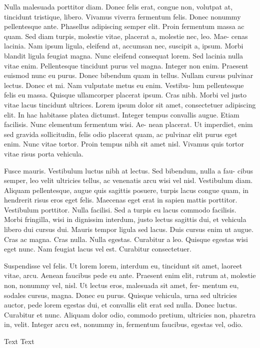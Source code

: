 \documentclass{book}
\begin{document}
Nulla malesuada porttitor diam. Donec felis erat, congue non, volutpat at,
tincidunt tristique, libero. Vivamus viverra fermentum felis. Donec nonummy
pellentesque ante. Phasellus adipiscing semper elit. Proin fermentum massa
ac quam. Sed diam turpis, molestie vitae, placerat a, molestie nec, leo. Mae-
cenas lacinia. Nam ipsum ligula, eleifend at, accumsan nec, suscipit a, ipsum.
Morbi blandit ligula feugiat magna. Nunc eleifend consequat lorem. Sed lacinia
nulla vitae enim. Pellentesque tincidunt purus vel magna. Integer non enim.
Praesent euismod nunc eu purus. Donec bibendum quam in tellus. Nullam
cursus pulvinar lectus. Donec et mi. Nam vulputate metus eu enim. Vestibu-
lum pellentesque felis eu massa.
Quisque ullamcorper placerat ipsum. Cras
nibh. Morbi vel justo vitae lacus tincidunt ultrices. Lorem ipsum dolor sit
amet, consectetuer adipiscing elit. In hac habitasse platea dictumst. Integer
tempus convallis augue. Etiam facilisis. Nunc elementum fermentum wisi. Ae-
nean placerat. Ut imperdiet, enim sed gravida sollicitudin, felis odio placerat
quam, ac pulvinar elit purus eget enim. Nunc vitae tortor. Proin tempus nibh
sit amet nisl. Vivamus quis tortor vitae risus porta vehicula.


Fusce mauris. Vestibulum luctus nibh at lectus. Sed bibendum, nulla a fau-
cibus semper, leo velit ultricies tellus, ac venenatis arcu wisi vel nisl. Vestibulum
diam. Aliquam pellentesque, augue quis sagittis posuere, turpis lacus congue
quam, in hendrerit risus eros eget felis. Maecenas eget erat in sapien mattis
porttitor. Vestibulum porttitor. Nulla facilisi. Sed a turpis eu lacus commodo
facilisis. Morbi fringilla, wisi in dignissim interdum, justo lectus sagittis dui, et
vehicula libero dui cursus dui. Mauris tempor ligula sed lacus. Duis cursus enim
ut augue. Cras ac magna. Cras nulla. Nulla egestas. Curabitur a leo. Quisque
egestas wisi eget nunc. Nam feugiat lacus vel est. Curabitur consectetuer.

Suspendisse vel felis. Ut lorem lorem, interdum eu, tincidunt sit amet,
laoreet vitae, arcu. Aenean faucibus pede eu ante. Praesent enim elit, rutrum
at, molestie non, nonummy vel, nisl. Ut lectus eros, malesuada sit amet, fer-
mentum eu, sodales cursus, magna. Donec eu purus. Quisque vehicula, urna sed
ultricies auctor, pede lorem egestas dui, et convallis elit erat sed nulla. Donec
luctus. Curabitur et nunc. Aliquam dolor odio, commodo pretium, ultricies
non, pharetra in, velit. Integer arcu est, nonummy in, fermentum faucibus,
egestas vel, odio.

Text Text
\end{document}
